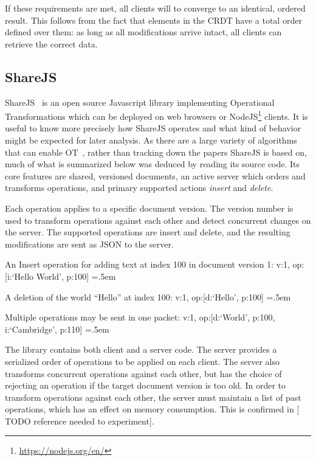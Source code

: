 \documentclass[12pt,a4paper,twoside,openright]{report}
\newenvironment{lcverbatim}
 {\SaveVerbatim{cverb}}
 {\endSaveVerbatim
  \flushleft\fboxrule=0pt\fboxsep=.5em
  \colorbox{cverbbg}{%
    \makebox[\dimexpr\linewidth-2\fboxsep][l]{\BUseVerbatim{cverb}}%
  }
  \endflushleft
}
\begin{document}
	If these requirements are met, all clients will to converge to an identical, ordered result. This follows from the fact that elements in the CRDT have a total order defined over them: as long as all modifications arrive intact, all clients can retrieve the correct data.

	\subsection{ShareJS} \label{sec:sharejs}
	
	ShareJS~\cite{sharejs} is an open source Javascript library implementing Operational Transformations which can be deployed on web browsers or NodeJS\footnote{\url{https://nodejs.org/en/}} clients. It is useful to know more precisely how ShareJS operates and what kind of behavior might be expected for later analysis. As there are a large variety of algorithms that can enable OT~\cite{kumawat2016}, rather than tracking down the papers ShareJS is based on, much of what is summarized below was deduced by reading its source code. Its core features are shared, versioned documents, an active server which orders and transforms operations, and primary supported actions \textit{insert} and \textit{delete}.
	
	Each operation applies to a specific document version. The version number is used to transform operations against each other and detect concurrent changes on the server. The supported operations are insert and delete, and the resulting modifications are sent as JSON to the server.
	
	An Insert operation for adding text at index 100 in document version 1:
\begin{lcverbatim}
{v:1, op:[{i:`Hello World', p:100}]}
\end{lcverbatim}

	A deletion of the world ``Hello'' at index 100:
\begin{lcverbatim}
{v:1, op:[{d:`Hello', p:100}]}
\end{lcverbatim}

	Multiple operations may be sent in one packet:
\begin{lcverbatim}
{v:1, op:[{d:`World', p:100}, {i:`Cambridge', p:110}]}
\end{lcverbatim}

\vspace{5mm}

	The library contains both client and a server code. The server provides a serialized order of operations to be applied on each client. The server also transforms concurrent operations against each other, but has the choice of rejecting an operation if the target document version is too old. In order to transform operations against each other, the server must maintain a list of past operations, which has an effect on memory consumption. This is confirmed in [ TODO reference needed to experiment].
	
\end{document}
